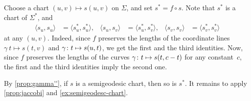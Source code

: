 Choose a chart $(u,v)\mapsto s(u,v)$ on $\Sigma$, and set
$s^{*} =f\circ s$.
Note that $s^{*}$ is a chart of $\Sigma^{*}$, and 
\begin{align*}
\langle s_u,s_u\rangle
&=
\langle s_u^{*}, s_u^{*}\rangle,
&
\langle s_u, s_v\rangle
&=
\langle s_u^{*}, s_v^{*}\rangle,
&
\langle s_v, s_v\rangle
&=
\langle s_v^{*}, s_v^{*}\rangle
\end{align*}
at any $(u,v)$.
Indeed, since $f$ preserves the lengths of the coordinate lines $\gamma\:t\mapsto s(t,v)$ and  $\gamma\:t\z\mapsto s(u,t)$, we get the first and the third identities.
Now, since $f$ preserves the lengths of the curves $\gamma\:t\z\mapsto s(t,c-t)$ for any constant~$c$, the first and the third identities imply the second one.

By \ref{prop:gamma''}, if $s$ is a semigeodesic chart, then so is $s^{*}$.
It remains to apply \ref{prop:jaccobi} and \ref{ex:semigeodesc-chart}.
\qeds
